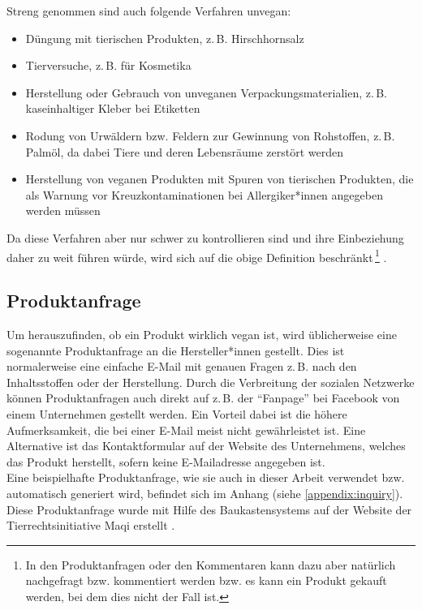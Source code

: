 Streng genommen sind auch folgende Verfahren unvegan:
\begin{itemize}
	\item Düngung mit tierischen Produkten, z.\,B.
			Hirschhornsalz
	\item Tierversuche, z.\,B. für Kosmetika
	\item Herstellung oder Gebrauch von unveganen Verpackungsmaterialien, z.\,B.
			kaseinhaltiger Kleber bei Etiketten
	\item Rodung von Urwäldern bzw. Feldern zur Gewinnung von Rohstoffen, z.\,B.
			Palmöl, da dabei Tiere und deren Lebensräume zerstört
			werden
	\item Herstellung von veganen Produkten mit Spuren von tierischen
			Produkten, die als Warnung vor Kreuzkontaminationen bei
			Allergiker*innen angegeben werden müssen
\end{itemize}

Da diese Verfahren aber nur schwer zu kontrollieren sind und ihre 
Einbeziehung daher zu weit
führen würde, wird sich auf die obige Definition
beschränkt\,\footnote{In den Produktanfragen oder den Kommentaren kann dazu aber natürlich
nachgefragt bzw. kommentiert werden bzw. es kann ein Produkt gekauft
werden, bei dem dies nicht der Fall ist.}
.

\subsection{Produktanfrage}
\label{sec:inquiry}

Um herauszufinden, ob ein Produkt wirklich vegan ist, wird
üblicherweise eine sogenannte Produktanfrage an die Hersteller*innen
gestellt. Dies ist normalerweise eine einfache E-Mail mit genauen Fragen z.\,B. nach
den Inhaltsstoffen oder der Herstellung.
Durch die Verbreitung der sozialen Netzwerke können Produktanfragen
auch direkt auf z.\,B. der "`Fanpage"' bei Facebook von einem Unternehmen gestellt
werden. Ein Vorteil dabei ist die höhere Aufmerksamkeit, die bei einer
E-Mail meist nicht gewährleistet ist.
Eine Alternative ist das Kontaktformular auf der Website des
Unternehmens, welches das Produkt herstellt, sofern keine
E-Mailadresse angegeben ist.\\
Eine beispielhafte Produktanfrage, wie sie auch in dieser Arbeit
verwendet bzw. automatisch generiert wird, befindet sich im Anhang (siehe
\ref{appendix:inquiry}).
Diese Produktanfrage wurde mit Hilfe des Baukastensystems auf der
Website der Tierrechtsinitiative Maqi erstellt
.

